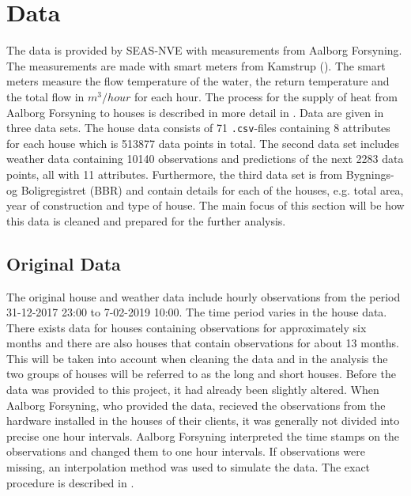 \chapter{Data}
\label{chap: data}
 The data is provided by SEAS-NVE with measurements from Aalborg Forsyning. The measurements are made with smart meters from Kamstrup (\cite{Kamstrup}). The smart meters measure the flow temperature of the water, the return temperature and the total flow in $m^3/hour$ for each hour. The process for the supply of heat from Aalborg Forsyning to houses is described in more detail in \cite{Aalborg}.
 Data are given in three data sets. The house data consists of 71 \texttt{.csv}-files containing 8 attributes for each house which is 513877 data points in total. The second data set includes weather data containing 10140 observations and predictions of the next 2283 data points, all with 11 attributes. Furthermore, the third data set is from Bygnings- og Boligregistret (BBR) and contain details for each of the houses, e.g. total area, year of construction and type of house.
The main focus of this section will be how this data is cleaned and prepared for the further analysis.

\section{Original Data}
The original house and weather data include hourly observations from the period 31-12-2017 23:00 to 7-02-2019 10:00. The time period varies in the house data. There exists data for houses containing observations for approximately six months and there are also houses that contain observations for about 13 months. This will be taken into account when cleaning the data and in the analysis the two groups of houses will be referred to as the long and short houses.
\noindent Before the data was provided to this project, it had already been slightly altered. When Aalborg Forsyning, who provided the data, recieved the observations from the hardware installed in the houses of their clients, it was generally not divided into precise one hour intervals. Aalborg Forsyning interpreted the time stamps on the observations and changed them to one hour intervals. If observations were missing, an interpolation method was used to simulate the data. The exact procedure is described in \cite{interpolation}. \\


